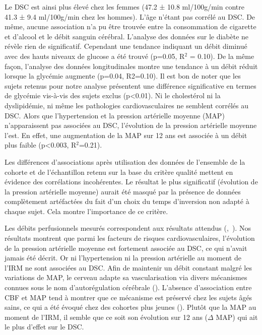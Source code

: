 Le DSC est ainsi plus élevé chez les femmes (47.2 ± 10.8 ml/100g/min contre 41.3 ± 9.4
ml/100g/min chez les hommes). L’âge n’étant pas corrélé au DSC. De même, aucune association n’a
pu être trouvée entre la consommation de cigarette et d’alcool et le débit sanguin cérébral. L’analyse
des données sur le diabète ne révèle rien de significatif. Cependant une tendance indiquant un débit
diminué avec des hauts niveaux de glucose a été trouvé (p=0.05, R$^2$ = 0.10). De la même façon, l’analyse
des données longitudinales montre une tendance à un débit réduit lorsque la glycémie augmente
(p=0.04, R2=0.10). Il est bon de noter que les sujets retenus pour notre analyse présentent une
différence significative en termes de glycémie vis-à-vis des sujets exclus (p<0.01). Ni le cholestérol ni
la dyslipidémie, ni même les pathologies cardiovasculaires ne semblent corrélés au DSC. Alors que
l’hypertension et la pression artérielle moyenne (MAP) n’apparaissent pas associées au DSC,
l’évolution de la pression artérielle moyenne l’est. En effet, une augmentation de la MAP sur 12 ans
est associée à un débit plus faible (p<0.003, R$^2$=0.21).

Les différences d’associations après utilisation des données de l’ensemble de la cohorte et de
l’échantillon retenu sur la base du critère qualité mettent en évidence des corrélations incohérentes.
Le résultat le plus significatif (évolution de la pression artérielle moyenne) aurait été masqué par la
présence de données complètement artéfactées du fait d’un choix du temps d’inversion non adapté à
chaque sujet. Cela montre l’importance de ce critère.

Les débits perfusionnels mesurés correspondent aux résultats attendus (\cite{Chen2011},~\cite{Brumm2010}). Nos
résultats montrent que parmi les facteurs de risques cardiovasculaires, l’évolution de la pression
artérielle moyenne est fortement associée au DSC, ce qui n’avait jamais été décrit. Or ni l’hypertension
ni la pression artérielle au moment de l’IRM ne sont associées au DSC. Afin de maintenir un débit constant
malgré les variations de MAP, le cerveau adapte sa vascularisation via divers mécanismes connues sous
le nom d’autorégulation cérébrale (\cite{Paulson1990}). L’absence d’association entre CBF et MAP tend à montrer que
ce mécanisme est préservé chez les sujets âgés sains, ce qui a été évoqué chez des cohortes plus jeunes
(\cite{Vanbeek2008}). Plutôt que la MAP au moment de l’IRM, il semble que ce soit son évolution sur 12 ans ($\Delta$ MAP)
qui ait le plus d’effet sur le DSC.

